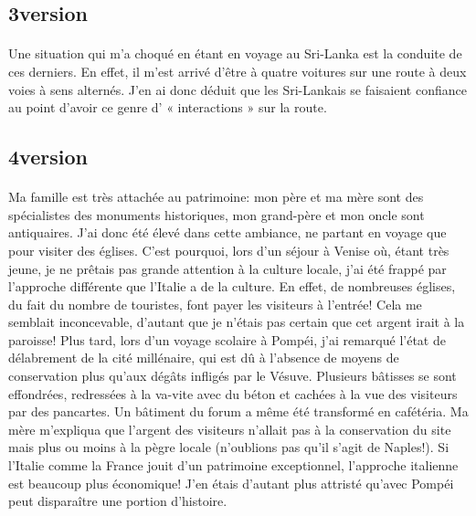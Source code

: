 \subsection{3\ieme version}

\paragraph{} Une situation qui m'a choqué en étant en voyage au Sri-Lanka est
la conduite de ces derniers. En effet, il m'est arrivé d'être à quatre voitures
sur une route à deux voies à sens alternés. J'en ai donc déduit que les
Sri-Lankais se faisaient confiance au point d'avoir ce genre d' « interactions
» sur la route.

\subsection{4\ieme version}

\paragraph{} Ma famille est très attachée au patrimoine: mon père et ma mère
sont des spécialistes des monuments historiques, mon grand-père et mon oncle
sont antiquaires. J'ai donc été élevé dans cette ambiance, ne partant en voyage
que pour visiter des églises. C'est pourquoi, lors d'un séjour à Venise où,
étant très jeune, je ne prêtais pas grande attention à la culture locale, j'ai
été frappé par l'approche différente que l'Italie a de la culture. En effet, de
nombreuses églises, du fait du nombre de touristes, font payer les visiteurs à
l'entrée! Cela me semblait inconcevable, d'autant que je n'étais pas certain
que cet argent irait à la paroisse! Plus tard, lors d'un voyage scolaire à
Pompéi, j'ai remarqué l'état de délabrement de la cité millénaire, qui est dû à
l'absence de moyens de conservation plus qu'aux dégâts infligés par le Vésuve.
Plusieurs bâtisses se sont effondrées, redressées à la va-vite avec du béton et
cachées à la vue des visiteurs par des pancartes. Un bâtiment du forum a même
été transformé en cafétéria. Ma mère m'expliqua que l'argent des visiteurs
n'allait pas à la conservation du site mais plus ou moins à la pègre locale
(n'oublions pas qu'il s'agit de Naples!). Si l'Italie comme la France jouit
d'un patrimoine exceptionnel, l'approche italienne est beaucoup plus
économique! J'en étais d'autant plus attristé qu'avec Pompéi peut disparaître
une portion d'histoire.


